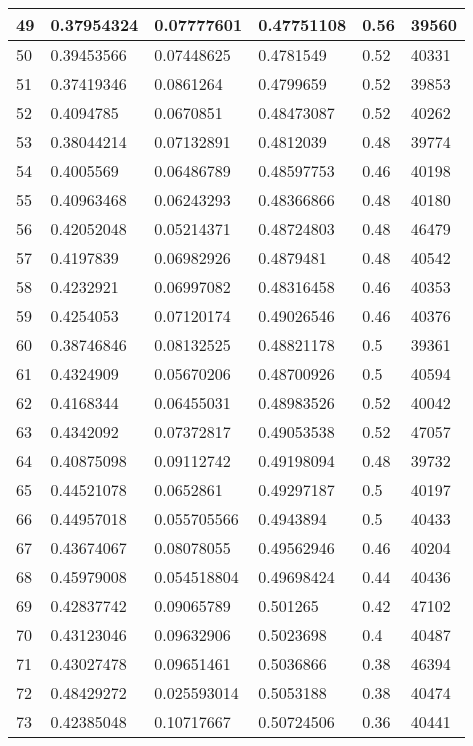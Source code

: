 \begin{longtable}{|l|l|l|l|l|l|}
49 & 0.37954324 & 0.07777601 & 0.47751108 & 0.56 & 39560 \\ \hline 
50 & 0.39453566 & 0.07448625 & 0.4781549 & 0.52 & 40331 \\ \hline 
51 & 0.37419346 & 0.0861264 & 0.4799659 & 0.52 & 39853 \\ \hline 
52 & 0.4094785 & 0.0670851 & 0.48473087 & 0.52 & 40262 \\ \hline 
53 & 0.38044214 & 0.07132891 & 0.4812039 & 0.48 & 39774 \\ \hline 
54 & 0.4005569 & 0.06486789 & 0.48597753 & 0.46 & 40198 \\ \hline 
55 & 0.40963468 & 0.06243293 & 0.48366866 & 0.48 & 40180 \\ \hline 
56 & 0.42052048 & 0.05214371 & 0.48724803 & 0.48 & 46479 \\ \hline 
57 & 0.4197839 & 0.06982926 & 0.4879481 & 0.48 & 40542 \\ \hline 
58 & 0.4232921 & 0.06997082 & 0.48316458 & 0.46 & 40353 \\ \hline 
59 & 0.4254053 & 0.07120174 & 0.49026546 & 0.46 & 40376 \\ \hline 
60 & 0.38746846 & 0.08132525 & 0.48821178 & 0.5 & 39361 \\ \hline 
61 & 0.4324909 & 0.05670206 & 0.48700926 & 0.5 & 40594 \\ \hline 
62 & 0.4168344 & 0.06455031 & 0.48983526 & 0.52 & 40042 \\ \hline 
63 & 0.4342092 & 0.07372817 & 0.49053538 & 0.52 & 47057 \\ \hline 
64 & 0.40875098 & 0.09112742 & 0.49198094 & 0.48 & 39732 \\ \hline 
65 & 0.44521078 & 0.0652861 & 0.49297187 & 0.5 & 40197 \\ \hline 
66 & 0.44957018 & 0.055705566 & 0.4943894 & 0.5 & 40433 \\ \hline 
67 & 0.43674067 & 0.08078055 & 0.49562946 & 0.46 & 40204 \\ \hline 
68 & 0.45979008 & 0.054518804 & 0.49698424 & 0.44 & 40436 \\ \hline 
69 & 0.42837742 & 0.09065789 & 0.501265 & 0.42 & 47102 \\ \hline 
70 & 0.43123046 & 0.09632906 & 0.5023698 & 0.4 & 40487 \\ \hline 
71 & 0.43027478 & 0.09651461 & 0.5036866 & 0.38 & 46394 \\ \hline 
72 & 0.48429272 & 0.025593014 & 0.5053188 & 0.38 & 40474 \\ \hline 
73 & 0.42385048 & 0.10717667 & 0.50724506 & 0.36 & 40441 \\ \hline 

\end{longtable}
